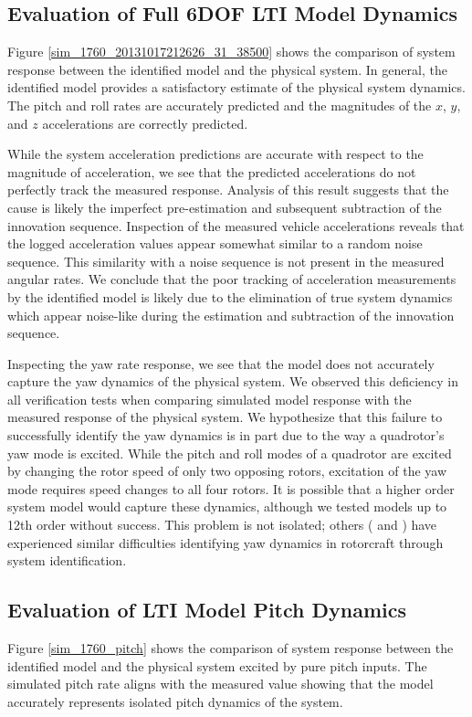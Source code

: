 \subsection{Evaluation of Full 6DOF LTI Model Dynamics}
Figure \ref{sim_1760_20131017212626_31_38500} shows the comparison of system response between the identified model and the physical system. In general, the identified model provides a satisfactory estimate of the physical system dynamics. The pitch and roll rates are accurately predicted and the magnitudes of the $x$, $y$, and $z$ accelerations are correctly predicted. 

While the system acceleration predictions are accurate with respect to the magnitude of acceleration, we see that the predicted accelerations do not perfectly track the measured response. Analysis of this result suggests that the cause is likely the imperfect pre-estimation and subsequent subtraction of the innovation sequence. Inspection of the measured vehicle accelerations reveals that the logged acceleration values appear somewhat similar to a random noise sequence. This similarity with a noise sequence is not present in the measured angular rates. We conclude that the poor tracking of acceleration measurements by the identified model is likely due to the elimination of true system dynamics which appear noise-like during the estimation and subtraction of the innovation sequence.

Inspecting the yaw rate response, we see that the model does not accurately capture the yaw dynamics of the physical system. We observed this deficiency in all verification tests when comparing simulated model response with the measured response of the physical system. We hypothesize that this failure to successfully identify the yaw dynamics is in part due to the way a quadrotor's yaw mode is excited. While the pitch and roll modes of a quadrotor are excited by changing the rotor speed of only two opposing rotors, excitation of the yaw mode requires speed changes to all four rotors. It is possible that a higher order system model would capture these dynamics, although we tested models up to 12th order without success. This problem is not isolated; others (\cite{lee2011attitude} and \cite{mettler2000system}) have experienced similar difficulties identifying yaw dynamics in rotorcraft through system identification.

\subsection{Evaluation of LTI Model Pitch Dynamics}
Figure \ref{sim_1760_pitch} shows the comparison of system response between the identified model and the physical system excited by pure pitch inputs. The simulated pitch rate aligns with the measured value showing that the model accurately represents isolated pitch dynamics of the system.


